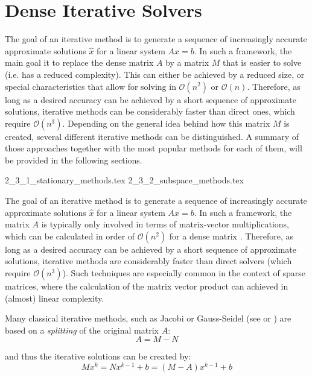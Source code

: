 \section{Dense Iterative Solvers}
\label{sec:iterative_solvers}

The goal of an iterative method is to generate a sequence of increasingly accurate approximate solutions $\hat{x}$ for a linear system $Ax=b$. In such a framework, the main goal it to replace the dense matrix $A$ by a matrix $M$ that is easier to solve (i.e. has a reduced complexity). This can either be achieved by a reduced size, or special characteristics that allow for solving in $\mathcal{O}(n^2)$ or $\mathcal{O}(n)$. Therefore, as long as a desired accuracy can be achieved by a short sequence of approximate solutions, iterative methods can be considerably faster than direct ones, which require $\mathcal{O}(n^3)$. Depending on the general idea behind how this matrix $M$ is created, several different iterative methods can be distinguished. A summary of those approaches together with the most popular methods for each of them, will be provided in the following sections.

{2_3_1_stationary_methods.tex}
{2_3_2_subspace_methods.tex}


The goal of an iterative method is to generate a sequence of increasingly accurate approximate solutions $\hat{x}$ for a linear system $Ax=b$. In such a framework, the matrix $A$ is typically only involved in terms of matrix-vector multiplications, which can be calculated in order of $\mathcal{O}(n^2)$ for a dense matrix \cite{golub_matrix_2013}. Therefore, as long as a desired accuracy can be achieved by a short sequence of approximate solutions, iterative methods are considerably faster than direct solvers (which require $\mathcal{O}(n^3)$). Such techniques are especially common in the context of sparse matrices, where the calculation of the matrix vector product can achieved in (almost) linear complexity.

Many classical iterative methods, such as Jacobi or Gauss-Seidel (see \cite{golub_matrix_2013} or \cite{saad_iterative_2003}) are based on a \textit{splitting} of the original matrix $A$:
\begin{equation}
\label{eqn:splitting}
    A = M - N
\end{equation}

\noindent and thus the iterative solutions can be created by:
\begin{equation}
    Mx^k = Nx^{k-1} +b = (M-A)x^{k-1}+b
\end{equation}

